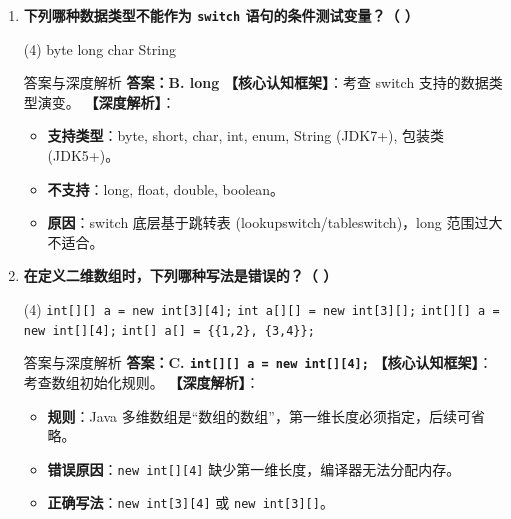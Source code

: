 ﻿\documentclass[12pt, a4paper]{ctexart}
\newcommand{\code}[1]{\texttt{#1}}
\begin{document}
\begin{enumerate}[label=\textbf{\arabic*.}, leftmargin=*, itemsep=1.5em]
	\item \textbf{下列哪种数据类型不能作为 \code{switch} 语句的条件测试变量？（ \quad ）}
	      \begin{tasks}(4)
		      \task byte \task long \task char \task String
	      \end{tasks}
	      \begin{bluebox}{答案与深度解析}
		      \textbf{答案：B. long}
		      \textbf{【核心认知框架】}：考查 switch 支持的数据类型演变。
		      \textbf{【深度解析】}：
		      \begin{itemize}[leftmargin=*, nosep]
			      \item \textbf{支持类型}：byte, short, char, int, enum, String (JDK7+), 包装类 (JDK5+)。
			      \item \textbf{不支持}：long, float, double, boolean。
			      \item \textbf{原因}：switch 底层基于跳转表 (lookupswitch/tableswitch)，long 范围过大不适合。
		      \end{itemize}
	      \end{bluebox}

	\item \textbf{在定义二维数组时，下列哪种写法是错误的？（ \quad ）}
	      \begin{tasks}(4)
		      \task \code{int[][] a = new int[3][4];}
		      \task \code{int a[][] = new int[3][];}
		      \task \code{int[][] a = new int[][4];}
		      \task \code{int[] a[] = \{\{1,2\}, \{3,4\}\};}
	      \end{tasks}
	      \begin{bluebox}{答案与深度解析}
		      \textbf{答案：C. \code{int[][] a = new int[][4];}}
		      \textbf{【核心认知框架】}：考查数组初始化规则。
		      \textbf{【深度解析】}：
		      \begin{itemize}[leftmargin=*, nosep]
			      \item \textbf{规则}：Java 多维数组是“数组的数组”，第一维长度必须指定，后续可省略。
			      \item \textbf{错误原因}：\code{new int[][4]} 缺少第一维长度，编译器无法分配内存。
			      \item \textbf{正确写法}：\code{new int[3][4]} 或 \code{new int[3][]}。
		      \end{itemize}
	      \end{bluebox}


\end{enumerate}
\end{document}
